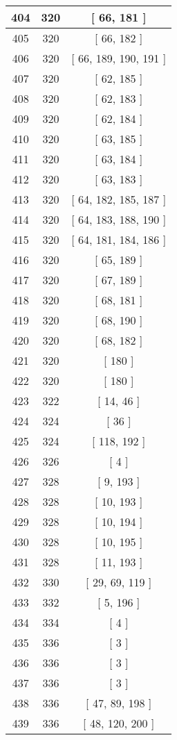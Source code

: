 \begin{center}
\begin{longtable}[H]{|| c c c ||}
404 & 320 & [ 66, 181 ]
\\\hline
405 & 320 & [ 66, 182 ]
\\\hline
406 & 320 & [ 66, 189, 190, 191 ]
\\\hline
407 & 320 & [ 62, 185 ]
\\\hline
408 & 320 & [ 62, 183 ]
\\\hline
409 & 320 & [ 62, 184 ]
\\\hline
410 & 320 & [ 63, 185 ]
\\\hline
411 & 320 & [ 63, 184 ]
\\\hline
412 & 320 & [ 63, 183 ]
\\\hline
413 & 320 & [ 64, 182, 185, 187 ]
\\\hline
414 & 320 & [ 64, 183, 188, 190 ]
\\\hline
415 & 320 & [ 64, 181, 184, 186 ]
\\\hline
416 & 320 & [ 65, 189 ]
\\\hline
417 & 320 & [ 67, 189 ]
\\\hline
418 & 320 & [ 68, 181 ]
\\\hline
419 & 320 & [ 68, 190 ]
\\\hline
420 & 320 & [ 68, 182 ]
\\\hline
421 & 320 & [ 180 ]
\\\hline
422 & 320 & [ 180 ]
\\\hline
423 & 322 & [ 14, 46 ]
\\\hline
424 & 324 & [ 36 ]
\\\hline
425 & 324 & [ 118, 192 ]
\\\hline
426 & 326 & [ 4 ]
\\\hline
427 & 328 & [ 9, 193 ]
\\\hline
428 & 328 & [ 10, 193 ]
\\\hline
429 & 328 & [ 10, 194 ]
\\\hline
430 & 328 & [ 10, 195 ]
\\\hline
431 & 328 & [ 11, 193 ]
\\\hline
432 & 330 & [ 29, 69, 119 ]
\\\hline
433 & 332 & [ 5, 196 ]
\\\hline
434 & 334 & [ 4 ]
\\\hline
435 & 336 & [ 3 ]
\\\hline
436 & 336 & [ 3 ]
\\\hline
437 & 336 & [ 3 ]
\\\hline
438 & 336 & [ 47, 89, 198 ]
\\\hline
439 & 336 & [ 48, 120, 200 ]
\\\hline

\end{longtable}
\end{center}
